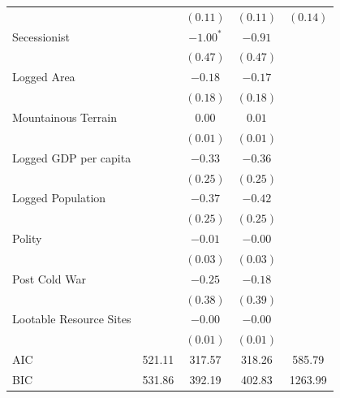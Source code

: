 \documentclass[12pt,]{book}
\let\origtable\table
\let\endorigtable\endtable
\renewenvironment{table}[1][2] {
    \singlespacing
    \expandafter\origtable\expandafter[H]
} {
    \endorigtable
}
\theoremstyle{definition}
\theoremstyle{definition}
\theoremstyle{remark}
\begin{document}
\begin{table}
\begin{center}
\begin{tabular}{l c c c c }
                                        &               & $(0.11)$     & $(0.11)$   & $(0.14)$     \\
Secessionist                            &               & $-1.00^{*}$  & $-0.91$    &              \\
                                        &               & $(0.47)$     & $(0.47)$   &              \\
Logged Area                             &               & $-0.18$      & $-0.17$    &              \\
                                        &               & $(0.18)$     & $(0.18)$   &              \\
Mountainous Terrain                     &               & $0.00$       & $0.01$     &              \\
                                        &               & $(0.01)$     & $(0.01)$   &              \\
Logged GDP per capita                   &               & $-0.33$      & $-0.36$    &              \\
                                        &               & $(0.25)$     & $(0.25)$   &              \\
Logged Population                       &               & $-0.37$      & $-0.42$    &              \\
                                        &               & $(0.25)$     & $(0.25)$   &              \\
Polity                                  &               & $-0.01$      & $-0.00$    &              \\
                                        &               & $(0.03)$     & $(0.03)$   &              \\
Post Cold War                           &               & $-0.25$      & $-0.18$    &              \\
                                        &               & $(0.38)$     & $(0.39)$   &              \\
Lootable Resource Sites                 &               & $-0.00$      & $-0.00$    &              \\
                                        &               & $(0.01)$     & $(0.01)$   &              \\
\hline
AIC                                     & 521.11        & 317.57       & 318.26     & 585.79       \\
BIC                                     & 531.86        & 392.19       & 402.83     & 1263.99      \\

\end{tabular}
\end{center}
\end{table}
\end{document}
